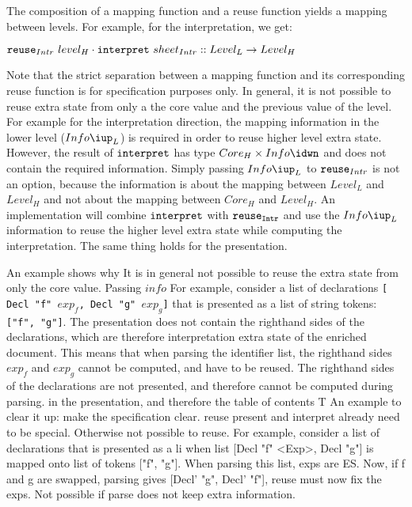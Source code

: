 The composition of a mapping function and a reuse function yields a mapping between levels. For example, for the interpretation, we get:

\begin{small}\begin{math}
{\tt reuse}_{Intr}~level_{H} \cdot {\tt interpret}~sheet_{Intr} :: Level_{L} \rightarrow Level_{H}
\end{math}\end{small} 

Note that the strict separation between a mapping function and its corresponding reuse function is for specification purposes only. In general, it is not possible to reuse extra state from only a the core value and the previous value of the level. For example for the interpretation direction, the mapping information in the lower level ($Info\iup_{L}$) is required in order to reuse higher level extra state. However, the result of ${\tt interpret}$ has type 
$Core_{H}\times Info\idwn$ and does not contain the required information. Simply passing $Info\iup_{L}$ to ${\tt reuse}_{Intr}$ is not an option, because the information is about the mapping between $Level_{L}$ and $Level_{H}$ and not about the mapping between $Core_{H}$ and $Level_{H}$. An implementation will combine ${\tt interpret}$ with ${\tt reuse_{Intr}}$ and use the $Info\iup_{L}$ information to reuse the higher level extra state while computing the interpretation. The same thing holds for the presentation.


\bc
 An example shows why It is in general not possible to reuse the extra state from only the core value. Passing $info$
For example, consider a list of declarations {\tt [ Decl "f" $exp_f$, Decl "g" $exp_g$]} that is presented as a list of string tokens: {\tt ["f", "g"]}. The presentation does not contain the righthand sides of the declarations, which are therefore interpretation extra state of the enriched document. This means that when parsing the identifier list, the righthand sides $exp_f$ and $exp_g$ cannot be computed, and have to be reused. 
The righthand sides of the declarations are not presented, and therefore cannot be computed during parsing. in the presentation, and therefore the table of contents T
An example to clear it up:
 make the specification clear. 
 reuse present and interpret already need to be special. Otherwise not possible to reuse. For example, consider a list of declarations that is presented as a li when list [Decl "f" <Exp>, Decl "g"] is mapped onto list of tokens ["f", "g"]. When parsing this list, exps are ES. Now, if f and g are swapped, parsing gives [Decl' "g", Decl' "f"],  reuse must now fix the exps. Not possible if parse does not keep extra information.
\ec

